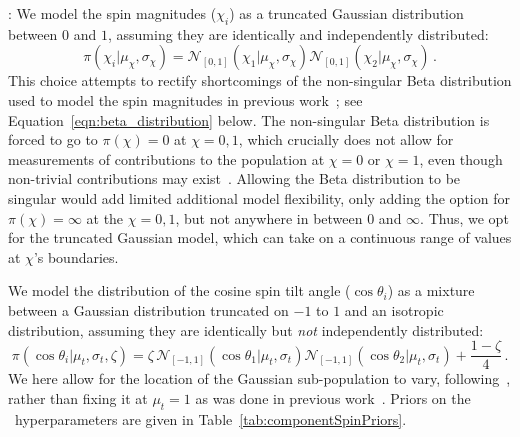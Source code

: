 :
We model the spin magnitudes ($\chi_i$) as a truncated Gaussian distribution between $0$ and $1$, assuming they are identically and independently distributed: 
%
\begin{equation}
    \pi(\chi_i|\mu_\chi,\sigma_\chi) = \mathcal{N}_{[0,1]}(\chi_1 | \mu_\chi, \sigma_\chi)\mathcal{N}_{[0,1]}(\chi_2 | \mu_\chi, \sigma_\chi)\,.
\label{eqn:spin_mag_model}
\end{equation}
%
This choice attempts to rectify shortcomings of the non-singular Beta distribution used to model the spin magnitudes in previous work~\citep{LIGOScientific:2018jsj, LIGOScientific:2020kqk, KAGRA:2021duu}; see Equation~\eqref{eqn:beta_distribution} below.
The non-singular Beta distribution is forced to go to $\pi(\chi)=0$ at $\chi=0,1$, which crucially does not allow for measurements of contributions to the population at $\chi=0$ or $\chi=1$, even though non-trivial contributions may exist~\citep{Callister:2022qwb,Galaudage:2021rkt,Hussain:2024qzl}.
Allowing the Beta distribution to be singular would add limited additional model flexibility, only adding the option for $\pi(\chi) = \infty$ at the $\chi=0,1$, but not anywhere in between $0$ and $\infty$. 
Thus, we opt for the truncated Gaussian model, which can take on a continuous range of values at $\chi$'s boundaries.

We model the distribution of the cosine spin tilt angle ($\cos\theta_i$) as a mixture between a Gaussian distribution truncated on $-1$ to $1$ and an isotropic distribution, assuming they are identically but \textit{not} independently distributed:
%
\begin{equation}
    \pi(\cos\theta_i| \mu_t, \sigma_t, \zeta ) = \zeta \,\mathcal{N}_{[-1,1]}(\cos\theta_1 | \mu_t, \sigma_t)\mathcal{N}_{[-1,1]}(\cos\theta_2 | \mu_t, \sigma_t) + \frac{1-\zeta}{4}\,.
\label{eqn:spin_tilt_model} 
\end{equation}
%
We here allow for the location of the Gaussian sub-population to vary, following~\cite{Vitale:2022dpa}, rather than fixing it at $\mu_t=1$ as was done in previous work~\citep{LIGOScientific:2018jsj, LIGOScientific:2020kqk, KAGRA:2021duu}.
Priors on the ~hyperparameters are given in Table~\ref{tab:componentSpinPriors}.

